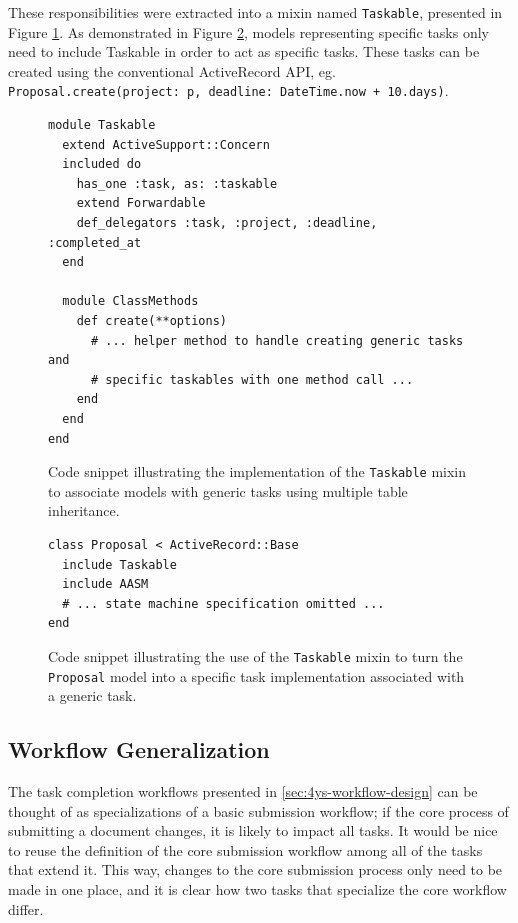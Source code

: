 \documentclass[document.tex]{subfiles}
\begin{document}
These responsibilities were extracted into a mixin named \verb!Taskable!, presented in Figure \ref{fig:taskable-mixin-definition}. As demonstrated in Figure \ref{fig:taskable-mixin-example}, models representing specific tasks only need to include Taskable in order to act as specific tasks. These tasks can be created using the conventional ActiveRecord API, eg. \\ \verb!Proposal.create(project: p, deadline: DateTime.now + 10.days)!.

\begin{figure}[!ht]
  \begin{lstlisting}
module Taskable
  extend ActiveSupport::Concern
  included do
    has_one :task, as: :taskable
    extend Forwardable
    def_delegators :task, :project, :deadline, :completed_at
  end

  module ClassMethods
    def create(**options)
      # ... helper method to handle creating generic tasks and
      # specific taskables with one method call ...
    end
  end
end
  \end{lstlisting}
  \cprotect\caption{Code snippet illustrating the implementation of the \verb!Taskable! mixin to associate models with generic tasks using multiple table inheritance.}
  \label{fig:taskable-mixin-definition}
\end{figure}

\begin{figure}[!ht]
  \begin{lstlisting}
class Proposal < ActiveRecord::Base
  include Taskable
  include AASM
  # ... state machine specification omitted ...
end
  \end{lstlisting}
  \cprotect\caption{Code snippet illustrating the use of the \verb!Taskable! mixin to turn the \verb!Proposal! model into a specific task implementation associated with a generic task.}
  \label{fig:taskable-mixin-example}
\end{figure}


\subsection{Workflow Generalization}
\label {sec:4ys-workflow-generalization}

The task completion workflows presented in \ref{sec:4ys-workflow-design} can be thought of as specializations of a basic submission workflow; if the core process of submitting a document changes, it is likely to impact all tasks. It would be nice to reuse the definition of the core submission workflow among all of the tasks that extend it. This way, changes to the core submission process only need to be made in one place, and it is clear how two tasks that specialize the core workflow differ.
\end{document}
